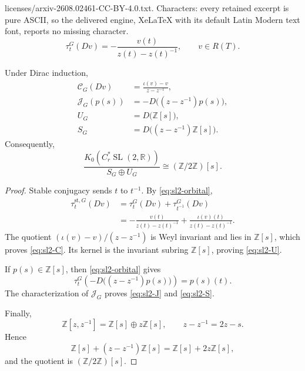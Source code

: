 \documentclass[10pt,a4paper]{amsart}
\newcommand{\Cr}{C_r^*}
\newcommand{\R}{\mathbb R}
\newcommand{\SL}{\operatorname{SL}}
\newcommand{\Z}{\mathbb Z}
\newcommand{\st}{\mathrm{st}}
\begin{document}
licenses/arxiv-2608.02461-CC-BY-4.0.txt. Characters: every retained excerpt is pure ASCII, so the delivered engine, XeLaTeX with its default Latin Modern text font, reports no missing character.
\begin{equation}\label{eq:sl2-orbital}
  \tau_t^G(Dv)
  =-\frac{v(t)}{z(t)-z(t)^{-1}},
  \qquad v\in R(T).
\end{equation}

\begin{proposition}[The two lattices for $\SL(2,\R)$]\label{prop:sl2}
Under Dirac induction,
\begin{align}
  \mathcal C_G(Dv)
  &=\frac{\iota(v)-v}{z-z^{-1}},\label{eq:sl2-C}\\
  \mathcal J_G(p(s))
  &=-D\bigl((z-z^{-1})p(s)\bigr),\label{eq:sl2-J}\\
  U_G&=D\bigl(\Z[s]\bigr),\label{eq:sl2-U}\\
  S_G&=D\bigl((z-z^{-1})\Z[s]\bigr).\label{eq:sl2-S}
\end{align}
Consequently,
\begin{equation}\label{eq:sl2-quotient}
  \frac{K_0(\Cr\SL(2,\R))}{S_G\oplus U_G}
  \cong(\Z/2\Z)[s].
\end{equation}
\end{proposition}

\begin{proof}
Stable conjugacy sends $t$ to $t^{-1}$.  By \eqref{eq:sl2-orbital},
\begin{align*}
  \tau_t^{\st,G}(Dv)
  &=\tau_t^G(Dv)+\tau_{t^{-1}}^G(Dv)\\
  &=-\frac{v(t)}{z(t)-z(t)^{-1}}
    +\frac{\iota(v)(t)}{z(t)-z(t)^{-1}}.
\end{align*}
The quotient $(\iota(v)-v)/(z-z^{-1})$ is Weyl invariant and lies in $\Z[s]$, which proves \eqref{eq:sl2-C}.  Its kernel is the invariant subring $\Z[s]$, proving \eqref{eq:sl2-U}.

If $p(s)\in\Z[s]$, then \eqref{eq:sl2-orbital} gives
\[
  \tau_t^G\left(-D\bigl((z-z^{-1})p(s)\bigr)\right)=p(s)(t).
\]
The characterization of $\mathcal J_G$ proves \eqref{eq:sl2-J} and \eqref{eq:sl2-S}.

Finally,
\[
  \Z[z,z^{-1}]=\Z[s]\oplus z\Z[s],
  \qquad z-z^{-1}=2z-s.
\]
Hence
\[
  \Z[s]+(z-z^{-1})\Z[s]
  =\Z[s]+2z\Z[s],
\]
and the quotient is $(\Z/2\Z)[s]$.
\end{proof}
\end{document}

